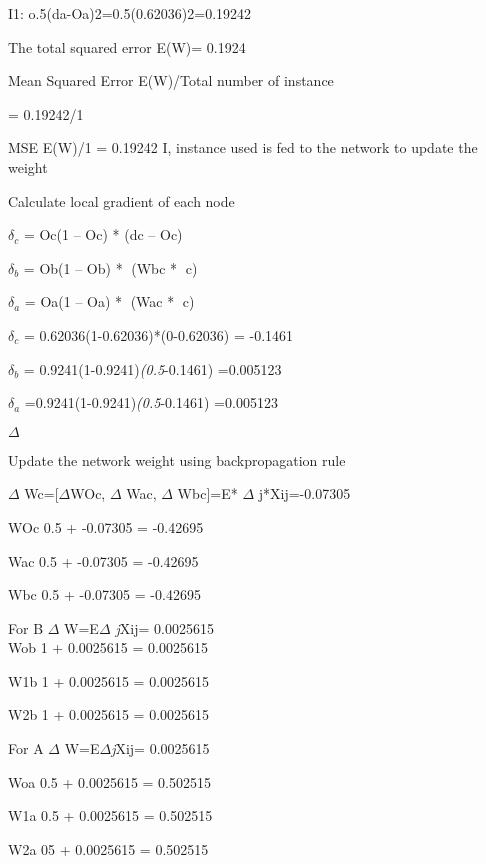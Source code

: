 \documentclass[11pt]{article}
\makeatletter
\newcommand{\boxspacing}{\kern\kvtcb@left@rule\kern\kvtcb@boxsep}
\newcommand{\prompt}[4]{
        {\ttfamily\llap{{\color{#2}[#3]:\hspace{3pt}#4}}\vspace{-\baselineskip}}
    }
\makeatother
\begin{document}
I1: o.5(da-Oa)2=0.5(0.62036)2=0.19242

The total squared error E(W)= 0.1924

Mean Squared Error E(W)/Total number of instance

= 0.19242/1

MSE E(W)/1 = 0.19242 I, instance used is fed to the network to update
the weight

Calculate local gradient of each node

\(\delta_c\) = Oc(1 -- Oc) * (dc -- Oc)

\(\delta_b\) = Ob(1 -- Ob) * (Wbc * c)

\(\delta_a\) = Oa(1 -- Oa) * (Wac * c)

\(\delta_c\) = 0.62036(1-0.62036)*(0-0.62036) = -0.1461

\(\delta_b\) = 0.9241(1-0.9241)\emph{(0.5}-0.1461) =0.005123

\(\delta_a\) =0.9241(1-0.9241)\emph{(0.5}-0.1461) =0.005123

\(\Delta\)

Update the network weight using backpropagation rule

\(\Delta\) Wc={[}\(\Delta\)WOc, \(\Delta\) Wac, \(\Delta\) Wbc{]}=E*
\(\Delta\) j*Xij=-0.07305

WOc 0.5 + -0.07305 = -0.42695

Wac 0.5 + -0.07305 = -0.42695

Wbc 0.5 + -0.07305 = -0.42695

For B \(\Delta\) W=E\emph{\(\Delta\) j}Xij= 0.0025615\\
Wob 1 + 0.0025615 = 0.0025615

W1b 1 + 0.0025615 = 0.0025615

W2b 1 + 0.0025615 = 0.0025615

For A \(\Delta\) W=E\emph{\(\Delta\)j}Xij= 0.0025615

Woa 0.5 + 0.0025615 = 0.502515

W1a 0.5 + 0.0025615 = 0.502515

W2a 05 + 0.0025615 = 0.502515

    \begin{tcolorbox}[breakable, size=fbox, boxrule=1pt, pad at break*=1mm,colback=cellbackground, colframe=cellborder]
\prompt{In}{incolor}{ }{\boxspacing}
\begin{Verbatim}[commandchars=\\\{\}]

\end{Verbatim}
\end{tcolorbox}


    
    
    
\end{document}
